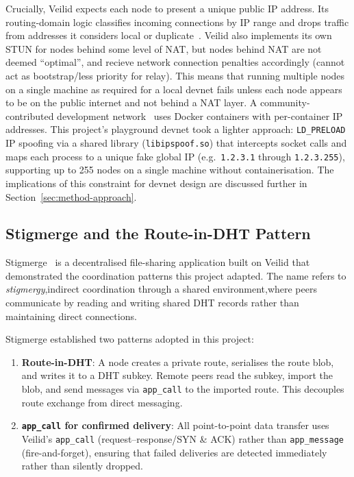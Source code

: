 Crucially, Veilid expects each node to present a unique public IP address.
Its routing-domain logic classifies incoming connections by IP range and
drops traffic from addresses it considers local or
duplicate~\cite{veilid_developer_book}. Veilid also implements its own STUN for nodes
behind some level of NAT, but nodes behind NAT are not deemed ``optimal'', and recieve
network connection penalties accordingly (cannot act as bootstrap/less priority for relay).
This means that running multiple nodes on a single machine as required for a local devnet fails
unless each node appears to be on the public internet and not behind a NAT layer.  A community-contributed development
network~\cite{veilid-devnet-mr444} uses Docker containers with
per-container IP addresses.  This project's playground devnet took a lighter
approach: \texttt{LD\_PRELOAD} IP spoofing via a shared library
(\texttt{libipspoof.so}) that intercepts socket calls and maps each process to
a unique fake global IP (e.g.\ \texttt{1.2.3.1} through \texttt{1.2.3.255}),
supporting up to 255 nodes on a single machine without containerisation.
The implications of this constraint for devnet design are discussed further in
Section~\ref{sec:method-approach}.

\subsection{Stigmerge and the Route-in-DHT Pattern}
\label{sec:ctx-stigmerge}

Stigmerge~\cite{stigmerge2024} is a decentralised file-sharing application
built on Veilid that demonstrated the coordination patterns this project
adapted.  The name refers to \emph{stigmergy},indirect coordination through
a shared environment,where peers communicate by reading and writing shared
DHT records rather than maintaining direct connections.

Stigmerge established two patterns adopted in this project:
\begin{enumerate}[noitemsep]
  \item \textbf{Route-in-DHT}: A node creates a private route, serialises the
    route blob, and writes it to a DHT subkey.  Remote peers read the subkey,
    import the blob, and send messages via \texttt{app\_call} to the imported
    route.  This decouples route exchange from direct messaging.
  \item \textbf{\texttt{app\_call} for confirmed delivery}: All point-to-point
    data transfer uses Veilid's \texttt{app\_call} (request--response/SYN \& ACK) rather
    than \texttt{app\_message} (fire-and-forget), ensuring that failed
    deliveries are detected immediately rather than silently dropped.
\end{enumerate}

